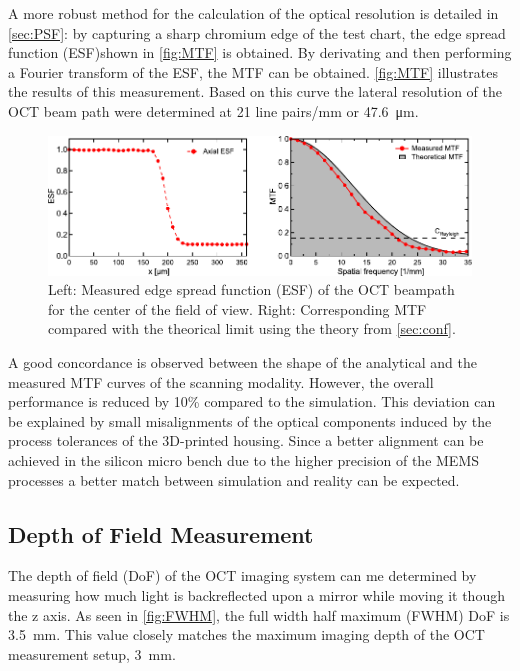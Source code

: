 A more robust method for the calculation of the optical resolution is detailed in \autoref{sec:PSF}: by capturing a sharp chromium edge of the test chart, the edge spread function (ESF)shown in \autoref{fig:MTF} is obtained. By derivating and then performing a Fourier transform of the ESF, the MTF can be obtained. \autoref{fig:MTF} illustrates the results of this measurement. Based on this curve the lateral resolution of the OCT beam path were determined at 21 line pairs/mm or \SI{47.6}{\micro\meter}. 
\begin{figure}[h!]\centering \includegraphics{figures/50_Measurements/conf/res/confResMeas.pdf}
      \caption{Left: Measured edge spread function (ESF) of the OCT beampath for the center of the field of view. 
      Right: Corresponding MTF compared with the theorical limit using the theory from \autoref{sec:conf}.}
      \label{fig:MTF}
\end{figure}
A good concordance is observed between the shape of the analytical and the measured MTF curves of the scanning modality. However, the overall performance is reduced by 10\% compared to the simulation. This deviation can be explained by small misalignments of the optical components induced by the process tolerances of the 3D-printed housing. Since a better alignment can be achieved in the silicon micro bench due to the higher precision of the MEMS processes a better match between simulation and reality can be expected.

\subsection{Depth of Field Measurement}
The depth of field (DoF) of the OCT imaging system can me determined by measuring how much light is backreflected upon a mirror while moving it though the z axis. As seen in \autoref{fig:FWHM}, the full width half maximum (FWHM) DoF is \SI{3.5}{\milli\meter}. This value closely matches the maximum imaging depth of the OCT measurement setup, \SI{3}{\milli\meter}. 

